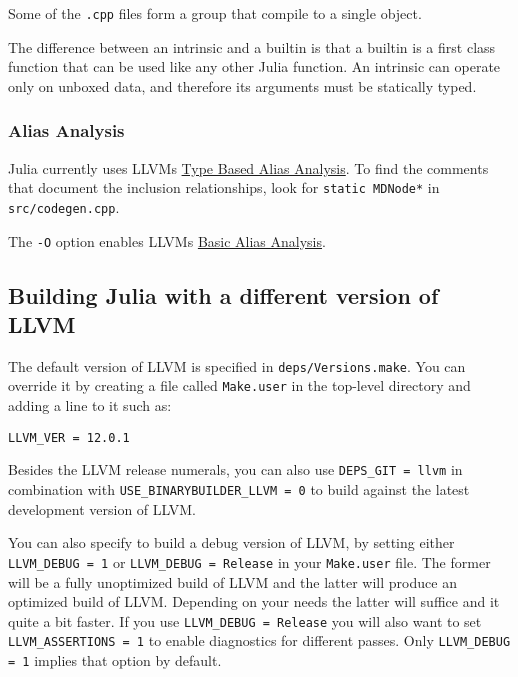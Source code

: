 Some of the \texttt{.cpp} files form a group that compile to a single object.



The difference between an intrinsic and a builtin is that a builtin is a first class function that can be used like any other Julia function.  An intrinsic can operate only on unboxed data, and therefore its arguments must be statically typed.



\hypertarget{8366324567299313031}{}


\subsubsection{Alias Analysis}



Julia currently uses LLVM{\textquotesingle}s \href{https://llvm.org/docs/LangRef.html\#tbaa-metadata}{Type Based Alias Analysis}. To find the comments that document the inclusion relationships, look for \texttt{static MDNode*} in \texttt{src/codegen.cpp}.



The \texttt{-O} option enables LLVM{\textquotesingle}s \href{https://llvm.org/docs/AliasAnalysis.html\#the-basic-aa-pass}{Basic Alias Analysis}.



\hypertarget{13120458447023898074}{}


\subsection{Building Julia with a different version of LLVM}



The default version of LLVM is specified in \texttt{deps/Versions.make}. You can override it by creating a file called \texttt{Make.user} in the top-level directory and adding a line to it such as:




\begin{lstlisting}
LLVM_VER = 12.0.1
\end{lstlisting}



Besides the LLVM release numerals, you can also use \texttt{DEPS\_GIT = llvm} in combination with \texttt{USE\_BINARYBUILDER\_LLVM = 0} to build against the latest development version of LLVM.



You can also specify to build a debug version of LLVM, by setting either \texttt{LLVM\_DEBUG = 1} or \texttt{LLVM\_DEBUG = Release} in your \texttt{Make.user} file. The former will be a fully unoptimized build of LLVM and the latter will produce an optimized build of LLVM. Depending on your needs the latter will suffice and it quite a bit faster. If you use \texttt{LLVM\_DEBUG = Release} you will also want to set \texttt{LLVM\_ASSERTIONS = 1} to enable diagnostics for different passes. Only \texttt{LLVM\_DEBUG = 1} implies that option by default.



